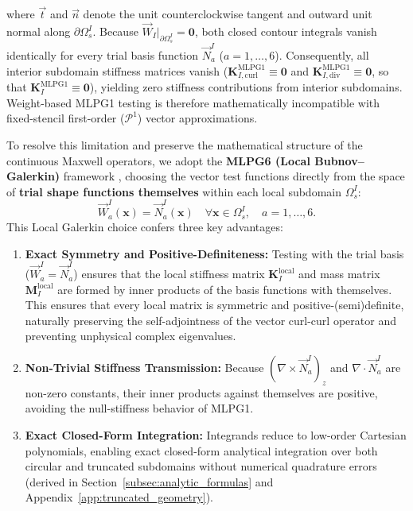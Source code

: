 \documentclass[VANCOUVER,Times1COL]{WileyNJD-v5}
\begin{document}
where $\vec{t}$ and $\vec{n}$ denote the unit counterclockwise tangent and outward unit normal along $\partial\Omega_s^I$. Because $\vec{W}_I|_{\partial\Omega_s^I} = \mathbf{0}$, both closed contour integrals vanish identically for every trial basis function $\vec{N}_a^I$ ($a = 1, \dots, 6$). Consequently, all interior subdomain stiffness matrices vanish ($\mathbf{K}_{I,\mathrm{curl}}^{\mathrm{MLPG1}} \equiv \mathbf{0}$ and $\mathbf{K}_{I,\mathrm{div}}^{\mathrm{MLPG1}} \equiv \mathbf{0}$, so that $\mathbf{K}_I^{\mathrm{MLPG1}} \equiv \mathbf{0}$), yielding zero stiffness contributions from interior subdomains. Weight-based MLPG1 testing is therefore mathematically incompatible with fixed-stencil first-order ($\mathcal{P}^1$) vector approximations.

To resolve this limitation and preserve the mathematical structure of the continuous Maxwell operators, we adopt the \textbf{MLPG6 (Local Bubnov--Galerkin)} framework \cite{atluri2002meshless}, choosing the vector test functions directly from the space of \textbf{trial shape functions themselves} within each local subdomain $\Omega_s^I$:
\begin{equation}
    \vec{W}_a^I(\mathbf{x}) = \vec{N}_a^I(\mathbf{x}) \quad \forall \mathbf{x} \in \Omega_s^I, \quad a = 1, \dots, 6.
    \label{eq:mlpg6_choice}
\end{equation}
This Local Galerkin choice confers three key advantages:
\begin{enumerate}
    \item \textbf{Exact Symmetry and Positive-Definiteness:} Testing with the trial basis ($\vec{W}_a^I = \vec{N}_a^I$) ensures that the local stiffness matrix $\mathbf{K}_I^{\mathrm{local}}$ and mass matrix $\mathbf{M}_I^{\mathrm{local}}$ are formed by inner products of the basis functions with themselves. This ensures that every local matrix is symmetric and positive-(semi)definite, naturally preserving the self-adjointness of the vector curl-curl operator and preventing unphysical complex eigenvalues.
    \item \textbf{Non-Trivial Stiffness Transmission:} Because $(\nabla \times \vec{N}_a^I)_z$ and $\nabla \cdot \vec{N}_a^I$ are non-zero constants, their inner products against themselves are positive, avoiding the null-stiffness behavior of MLPG1.
    \item \textbf{Exact Closed-Form Integration:} Integrands reduce to low-order Cartesian polynomials, enabling exact closed-form analytical integration over both circular and truncated subdomains without numerical quadrature errors (derived in Section~\ref{subsec:analytic_formulas} and Appendix~\ref{app:truncated_geometry}).
\end{enumerate}
\end{document}
